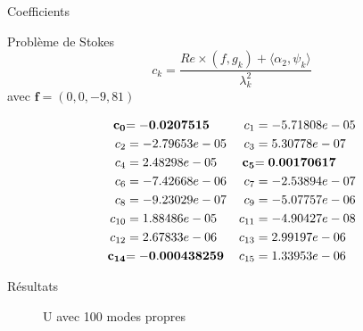 \documentclass{beamer}
\begin{document}
\begin{frame}{Coefficients}
\begin{block}{Problème de Stokes}
\[
c_k = \frac{Re\times (f,g_k)+\langle \alpha_2,\psi_k\rangle}{\lambda_k^2}
\]
avec $\bm{f}=(0,0,-9,81)$
\end{block}
\begin{align*}
\bf{c_{0}} &\bf{= -0.0207515}&c_{1} &= -5.71808e-05\\
c_{2} &= -2.79653e-05&c_{3} &= 5.30778e-07\\
c_{4} &= 2.48298e-05&\bf{c_{5}} &\bf{= 0.00170617}\\
c_{6} &= -7.42668e-06&c_{7} &= -2.53894e-07\\
c_{8} &= -9.23029e-07&c_{9} &= -5.07757e-06\\
c_{10} &= 1.88486e-05&c_{11} &= -4.90427e-08\\
c_{12} &= 2.67833e-06&c_{13} &= 2.99197e-06\\
\bf{c_{14}} &\bf{= -0.000438259}&c_{15} &= 1.33953e-06
\end{align*}
\end{frame}

\begin{frame}{Résultats}
\begin{figure}[H]
\caption{U avec 100 modes propres}
\end{figure}
\end{frame}
\end{document}
